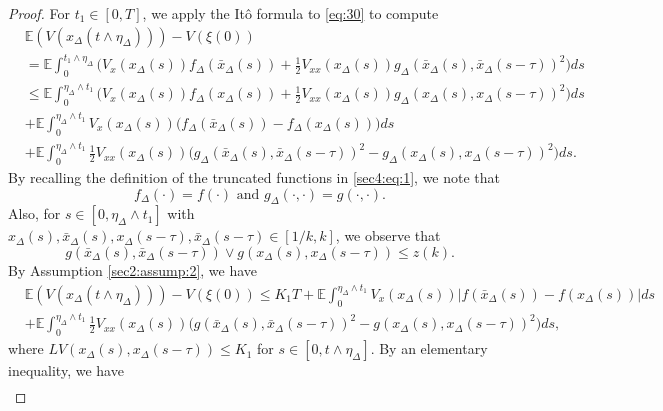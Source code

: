\documentclass[10pt,a4paper]{amsart}
\begin{document}
\begin{proof}
For $t_1\in[0,T]$, we apply the It\^{o} formula to \eqref{eq:30} to compute
\begin{align*}
&\mathbb{E}(V(x_{\Delta}(t\wedge \eta_{\Delta})))-V(\xi(0))\\
&=\mathbb{E}\int_{0}^{t_1\wedge \eta_{\Delta}}\Big(V_x(x_{\Delta}(s))f_{\Delta}(\bar{x}_{\Delta}(s))+\frac{1}{2}V_{xx}(x_{\Delta}(s))g_{\Delta}(\bar{x}_{\Delta}(s),\bar{x}_{\Delta}(s-\tau))^2\Big)ds\\
&\le\mathbb{E}\int_{0}^{\eta_{\Delta}\wedge t_1}\Big(V_x(x_{\Delta}(s))f_{\Delta}(x_{\Delta}(s))+\frac{1}{2}V_{xx}(x_{\Delta}(s))g_{\Delta}(x_{\Delta}(s),x_{\Delta}(s-\tau))^2\Big)ds\\
&+\mathbb{E}\int_{0}^{\eta_{\Delta}\wedge t_1}V_x(x_{\Delta}(s))\Big(f_{\Delta}(\bar{x}_{\Delta}(s))-f_{\Delta}(x_{\Delta}(s))\Big)ds\\
&+\mathbb{E}\int_{0}^{\eta_{\Delta}\wedge t_1}\frac{1}{2}V_{xx}(x_{\Delta}(s))\Big(g_{\Delta}(\bar{x}_{\Delta}(s),\bar{x}_{\Delta}(s-\tau))^2-g_{\Delta}(x_{\Delta}(s),x_{\Delta}(s-\tau))^2\Big)ds.
\end{align*}
By recalling the definition of the truncated functions in \eqref{sec4:eq:1}, we note that
\begin{equation}\label{sec5:eq:recall0}
f_{\Delta}(\cdot)=f(\cdot)\text{ and } g_{\Delta}(\cdot,\cdot)=g(\cdot,\cdot).
\end{equation}
Also, for  $s\in[0,\eta_{\Delta}\wedge t_1]$ with $x_{\Delta}(s),\bar{x}_{\Delta}(s),x_{\Delta}(s-\tau),\bar{x}_{\Delta}(s-\tau)\in[1/k,k]$, we observe that
\begin{equation}\label{sec5:eq:recall1}
g(\bar{x}_{\Delta}(s),\bar{x}_{\Delta}(s-\tau))\vee g(x_{\Delta}(s),x_{\Delta}(s-\tau))\le z(k).
\end{equation}
By Assumption \ref{sec2:assump:2}, we have 
\begin{align*}
&\mathbb{E}(V(x_{\Delta}(t\wedge \eta_{\Delta})))-V(\xi(0))\le K_1T+\mathbb{E}\int_{0}^{\eta_{\Delta}\wedge t_1}V_x(x_{\Delta}(s))\vert f(\bar{x}_{\Delta}(s))-f(x_{\Delta}(s))\vert ds\\
&+\mathbb{E}\int_{0}^{\eta_{\Delta}\wedge t_1}\frac{1}{2}V_{xx}(x_{\Delta}(s))\Big(g(\bar{x}_{\Delta}(s),\bar{x}_{\Delta}(s-\tau))^2-g(x_{\Delta}(s),x_{\Delta}(s-\tau))^2\Big)ds,
\end{align*}
where $LV(x_{\Delta}(s),x_{\Delta}(s-\tau))\le K_1$ for $s\in[0,t\wedge \eta_{\Delta}]$. By  an elementary inequality, we have
\begin{align*}

\end{align*}
\end{proof}
\end{document}

